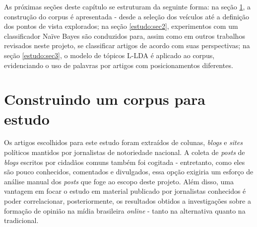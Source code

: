
As próximas seções deste capítulo se estruturam da seguinte forma: na seção \ref{estudo:sec1}, a construção do corpus é apresentada - desde a seleção dos veículos até a definição dos pontos de vista explorados; na seção \ref{estudo:sec2}, experimentos com um classificador Naïve Bayes são conduzidos para, assim como em outros trabalhos revisados neste projeto, se classificar artigos de acordo com suas perspectivas; na seção \ref{estudo:sec3}, o modelo de tópicos L-LDA é aplicado ao corpus, evidenciando o uso de palavras por artigos com posicionamentos diferentes. 


\section{Construindo um corpus para estudo}
\label{estudo:sec1}


Os artigos escolhidos para este estudo foram extraídos de colunas, \emph{blogs} e \emph{sites} políticos mantidos por jornalistas de notoriedade nacional. A coleta de \emph{posts} de \emph{blogs} escritos por cidadãos comuns também foi cogitada - entretanto, como eles são pouco conhecidos, comentados e divulgados, essa opção exigiria um esforço de análise manual dos \emph{posts} que foge ao escopo deste projeto. Além disso, uma vantagem em focar o estudo em material publicado por jornalistas conhecidos é poder correlacionar, posteriormente, os resultados obtidos a investigações sobre a formação de opinião na mídia brasileira \emph{online} - tanto na alternativa quanto na tradicional. 

